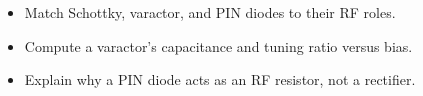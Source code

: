 \begin{objectives}
\begin{itemize}[leftmargin=1.4em,itemsep=2pt]
\item Match Schottky, varactor, and PIN diodes to their RF roles.
\item Compute a varactor's capacitance and tuning ratio versus bias.
\item Explain why a PIN diode acts as an RF resistor, not a rectifier.
\end{itemize}
\end{objectives}
